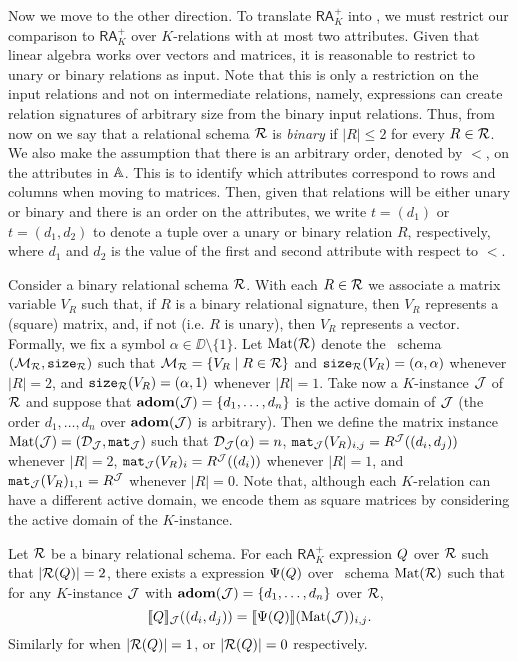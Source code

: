 Now we move to the other direction.
To translate $\mathsf{RA}_{K}^+$  into \langsum, we must restrict our comparison to $\mathsf{RA}_{K}^+$  over $K$-relations with at most two attributes. Given that linear algebra works over vectors and matrices, it is reasonable to restrict to unary or binary relations as input. Note that this is only a restriction on the input relations and not on intermediate relations, namely, expressions can create relation signatures of arbitrary size from the binary input relations. 
Thus, from now on we say that a relational schema $\mathcal{R}$ is \textit{binary} if $|R| \leq 2$ for every $R \in \mathcal{R}$. We also make the assumption that there is an arbitrary order, denoted by $<$, on the attributes in $\mathbb{A}$. 
This is to identify which attributes correspond to rows and columns when moving to matrices. 
Then, given that relations will be  either unary or binary and there is an order on the attributes, we write $t = (d_1)$ or $t = (d_1,d_2)$ to denote a tuple over a unary or binary relation $R$, respectively, where $d_1$ and $d_2$ is the value of the first and second attribute with respect to $<$.

Consider a binary relational schema $\mathcal{R}$. With each $R\in \mathcal{R}$ we associate a matrix variable $V_R$ such that, if $R$ is a binary relational signature, then $V_R$ represents a (square) matrix, and, if not (i.e. $R$ is unary), then $V_R$ represents a vector. Formally, we fix a symbol $\alpha \in \DD \setminus \{1\}$. Let $\text{Mat}(\mathcal{R})$ denote the \lang \ schema
$(\mathcal{M}_{\mathcal{R}},\texttt{size}_{\mathcal{R}})$ such that $\mathcal{M}_{\mathcal{R}} = \{ V_R \mid R \in \mathcal{R}\}$ and $\texttt{size}_{\mathcal{R}}(V_R) = (\alpha, \alpha)$ whenever $|R| = 2$, and $\texttt{size}_{\mathcal{R}}(V_R) = (\alpha, 1)$ whenever $|R|=1$. 
Take now a $K$-instance $\mathcal{J}$ of $\mathcal{R}$ and suppose that $\mathbf{adom}(\mathcal{J}) = \{d_1, \ldots, d_n\}$ is the active domain of $\mathcal{J}$ (the order $d_1, \ldots, d_n$ over $\mathbf{adom}(\mathcal{J})$ is arbitrary). Then we define the matrix instance $\text{Mat}(\mathcal{J}) = (\mathcal{D}_{\mathcal{J}},\texttt{mat}_{\mathcal{J}})$ such that $\mathcal{D}_{\mathcal{J}}(\alpha) = n$, $\texttt{mat}_{\mathcal{J}}(V_R)_{i,j} = R^{\mathcal{J}}((d_i, d_j))$ whenever $|R|=2$,  $\texttt{mat}_{\mathcal{J}}(V_R)_{i} = R^{\mathcal{J}}((d_i))$ whenever $|R|=1$, and $\texttt{mat}_{\mathcal{J}}(V_R)_{1,1} = R^{\mathcal{J}}$ whenever $|R|=0$. 
Note that, although each $K$-relation can have a different active domain, we encode them as square matrices by considering the active domain of the $K$-instance. %
\begin{proposition}\label{prop:ara_to_sum} 
	Let $\mathcal{R}$ be a binary relational schema. For each $\mathsf{RA}_{K}^+$  expression $Q$ over $\mathcal{R}$  such that $|\mathcal{R}(Q)| = 2$, there exists a \langsum  expression $\Psi(Q)$ over \lang \ schema $\text{Mat}(\mathcal{R})$ such that for any $K$-instance $\mathcal{J}$ with $\mathbf{adom}(\mathcal{J}) = \{d_1, \ldots, d_n\}$ over $\mathcal{R}$,
	$$
	\llbracket Q \rrbracket_{\mathcal{J}}((d_i, d_j))=\llbracket \Psi(Q) \rrbracket(\text{Mat}(\mathcal{J}))_{i,j}.
	$$
	Similarly for when $|\mathcal{R}(Q)| = 1$, or $|\mathcal{R}(Q)| = 0$ respectively.
\end{proposition}

